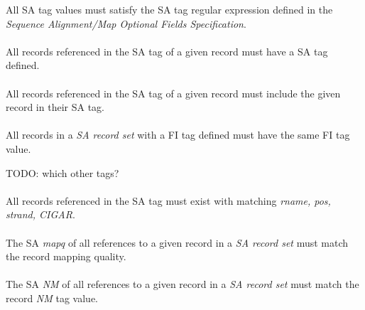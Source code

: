 \documentclass[10pt]{article}
\begin{document}
All SA tag values must satisfy the SA tag regular expression
defined in the {\sl Sequence Alignment/Map Optional Fields Specification}.

\paragraph{}

All records referenced in the SA tag of a given record must have a SA tag defined.

\paragraph{}

All records referenced in the SA tag of a given record must include the given
record in their SA tag.

\paragraph{}

All records in a \textit{SA record set} with a FI tag defined must have the same FI tag value.

TODO: which other tags?

\paragraph{}

All records referenced in the SA tag must exist with matching \textit{rname, pos, strand, CIGAR}.

\paragraph{}

The SA \textit{mapq} of all references to a given record in a \textit{SA record set} must
match the record mapping quality.

\paragraph{}

The SA \textit{NM} of all references to a given record in a \textit{SA record set} must
match the record \textit{NM} tag value.

\paragraph{}
\end{document}
